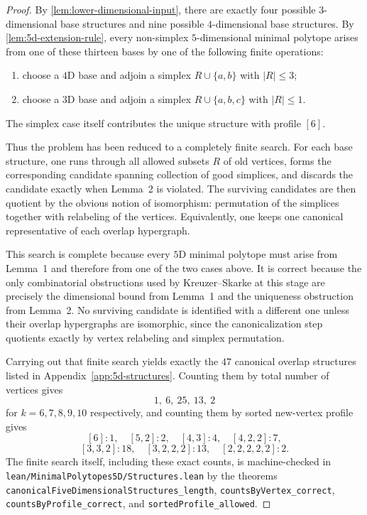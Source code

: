 \begin{proof}
By \cref{lem:lower-dimensional-input}, there are exactly four possible
$3$-dimensional base structures and nine possible $4$-dimensional base
structures.  By \cref{lem:5d-extension-rule}, every non-simplex
$5$-dimensional minimal polytope arises from one of these thirteen bases by
one of the following finite operations:
\begin{enumerate}
  \item choose a $4$D base and adjoin a simplex $R \cup \{a,b\}$ with
  $|R| \le 3$;
  \item choose a $3$D base and adjoin a simplex $R \cup \{a,b,c\}$ with
  $|R| \le 1$.
\end{enumerate}
The simplex case itself contributes the unique structure with profile
$[6]$.

Thus the problem has been reduced to a completely finite search.  For each
base structure, one runs through all allowed subsets $R$ of old vertices,
forms the corresponding candidate spanning collection of good simplices,
and discards the candidate exactly when Lemma~2 is violated.  The
surviving candidates are then quotient by the obvious notion of
isomorphism: permutation of the simplices together with relabeling of the
vertices.  Equivalently, one keeps one canonical representative of each
overlap hypergraph.

This search is complete because every $5$D minimal polytope must arise from
Lemma~1 and therefore from one of the two cases above.  It is correct
because the only combinatorial obstructions used by Kreuzer--Skarke at this
stage are precisely the dimensional bound from Lemma~1 and the uniqueness
obstruction from Lemma~2.  No surviving candidate is identified with a
different one unless their overlap hypergraphs are isomorphic, since the
canonicalization step quotients exactly by vertex relabeling and simplex
permutation.

Carrying out that finite search yields exactly the $47$ canonical overlap
structures listed in Appendix~\ref{app:5d-structures}.  Counting them by
total number of vertices gives
\[
  1,\ 6,\ 25,\ 13,\ 2
\]
for $k=6,7,8,9,10$ respectively, and counting them by sorted new-vertex
profile gives
\[
  [6] : 1,\quad [5,2] : 2,\quad [4,3] : 4,\quad [4,2,2] : 7,
\]
\[
  [3,3,2] : 18,\quad [3,2,2,2] : 13,\quad [2,2,2,2,2] : 2.
\]
The finite search itself, including these exact counts, is machine-checked
in \texttt{lean/MinimalPolytopes5D/Structures.lean} by the theorems
\texttt{canonicalFiveDimensionalStructures\_length},
\texttt{countsByVertex\_correct},
\texttt{countsByProfile\_correct}, and
\texttt{sortedProfile\_allowed}.
\end{proof}


